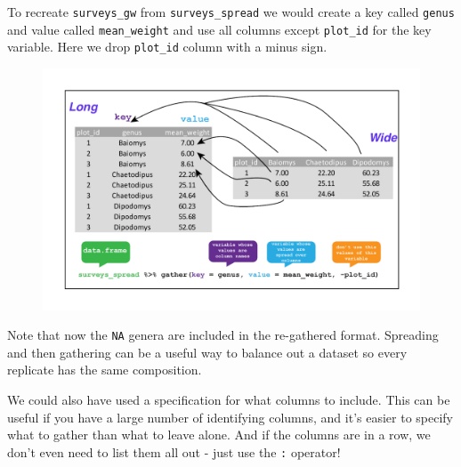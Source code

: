 \documentclass[]{book}
\newenvironment{Shaded}{\begin{snugshade}}{\end{snugshade}}
\newcommand{\KeywordTok}[1]{\textcolor[rgb]{0.13,0.29,0.53}{\textbf{#1}}}
\newcommand{\DataTypeTok}[1]{\textcolor[rgb]{0.13,0.29,0.53}{#1}}
\newcommand{\StringTok}[1]{\textcolor[rgb]{0.31,0.60,0.02}{#1}}
\newcommand{\OperatorTok}[1]{\textcolor[rgb]{0.81,0.36,0.00}{\textbf{#1}}}
\newcommand{\NormalTok}[1]{#1}
\begin{document}
To recreate \texttt{surveys\_gw} from \texttt{surveys\_spread} we would
create a key called \texttt{genus} and value called
\texttt{mean\_weight} and use all columns except \texttt{plot\_id} for
the key variable. Here we drop \texttt{plot\_id} column with a minus
sign.

\begin{Shaded}
\end{Shaded}

\begin{figure}
\centering
\includegraphics{img/gather_data_R.png}
\caption{}
\end{figure}

Note that now the \texttt{NA} genera are included in the re-gathered
format. Spreading and then gathering can be a useful way to balance out
a dataset so every replicate has the same composition.

We could also have used a specification for what columns to include.
This can be useful if you have a large number of identifying columns,
and it's easier to specify what to gather than what to leave alone. And
if the columns are in a row, we don't even need to list them all out -
just use the \texttt{:} operator!

\begin{Shaded}
\end{Shaded}
\end{document}
